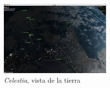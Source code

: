 \begin{figure}[!htb]
    \centering
    \includegraphics[width=0.5\textwidth]{img/celestia}
    \caption{\emph{Celestia}, vista de la tierra}
    \label{fig:celestia}
\end{figure}
